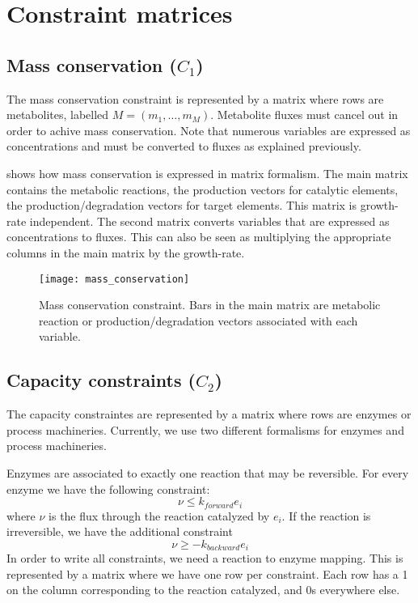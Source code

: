 
\section{Constraint matrices}

\subsection{Mass conservation ($C_1$)}

The mass conservation constraint is represented by a matrix where rows
are metabolites, labelled $M = (m_1, \ldots, m_M)$.
Metabolite fluxes must cancel out in order to achive mass conservation.
Note that numerous variables are expressed as concentrations and must be
converted to fluxes as explained previously.

 shows how mass conservation is expressed
in matrix formalism.
The main matrix contains the metabolic reactions,
the production vectors for catalytic elements,
the production/degradation vectors for target elements.
This matrix is growth-rate independent.
The second matrix converts variables that are expressed as
concentrations to fluxes.
This can also be seen as multiplying the appropriate columns in the main matrix
by the growth-rate.

\begin{figure}
  \centering
  \texttt{[image: mass\_conservation]}
  \caption{Mass conservation constraint.
  Bars in the main matrix are metabolic reaction or
  production/degradation vectors associated with each variable.}
  \label{fig:mass_conservation}
\end{figure}

\subsection{Capacity constraints ($C_2$)}

The capacity constraintes are represented by a matrix where rows are enzymes
or process machineries.
Currently, we use two different formalisms for enzymes and process machineries.

Enzymes are associated to exactly one reaction that may be reversible.
For every enzyme we have the following constraint:
\[
  \nu \leq k_{forward} e_i
\]
where $\nu$ is the flux through the reaction catalyzed by $e_i$.
If the reaction is irreversible, we have the additional constraint
\[
  \nu \geq -k_{backward} e_i
\]
In order to write all constraints, we need a reaction to enzyme mapping.
This is represented by a matrix where we have one row per constraint.
Each row has a 1 on the column corresponding to the reaction catalyzed,
and 0s everywhere else.

